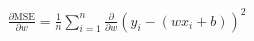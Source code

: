 \documentclass[preview]{standalone}
\begin{document}
\begin{align*}
\frac{\partial \text{MSE}}{\partial w} = \frac{1}{n} \sum_{i=1}^{n} \frac{\partial}{\partial w} \left( y_i - (w x_i + b) \right)^2
\end{align*}
\end{document}
